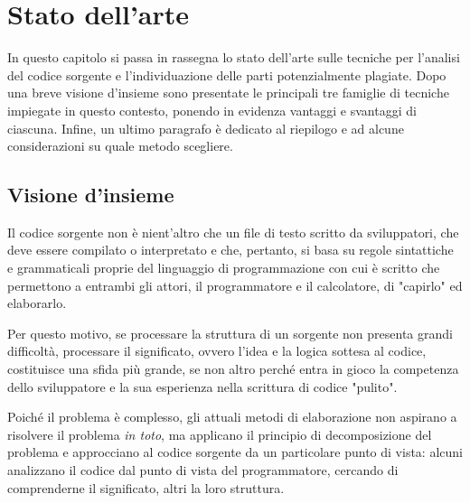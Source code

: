 \chapter{Stato dell'arte}
\label{chapter:stateOfArt}
In questo capitolo si passa in rassegna lo stato dell'arte sulle tecniche per l'analisi del codice sorgente e l'individuazione delle parti potenzialmente plagiate.
%
Dopo una breve visione d'insieme sono presentate le principali tre famiglie di tecniche impiegate in questo contesto, ponendo in evidenza vantaggi e svantaggi di ciascuna.
%
Infine, un ultimo paragrafo è dedicato al riepilogo e ad alcune considerazioni su quale metodo scegliere.

\section{Visione d'insieme}
Il codice sorgente non è nient'altro che un file di testo scritto da sviluppatori, che deve essere compilato o interpretato e che, pertanto, si basa su regole sintattiche e grammaticali proprie del linguaggio di programmazione con cui è scritto che permettono a entrambi gli attori, il programmatore e il calcolatore, di "capirlo" ed elaborarlo.

Per questo motivo, se processare la struttura di un sorgente non presenta grandi difficoltà, processare il significato, ovvero l'idea e la logica sottesa al codice, costituisce una sfida più grande, se non altro perché entra in gioco la competenza dello sviluppatore e la sua esperienza nella scrittura di codice "pulito".

Poiché il problema è complesso, gli attuali metodi di elaborazione non aspirano a risolvere il problema \textit{in toto}, ma applicano il principio di decomposizione del problema e approcciano al codice sorgente da un particolare punto di vista: alcuni analizzano il codice dal punto di vista del programmatore, cercando di comprenderne il significato, altri la loro struttura.



